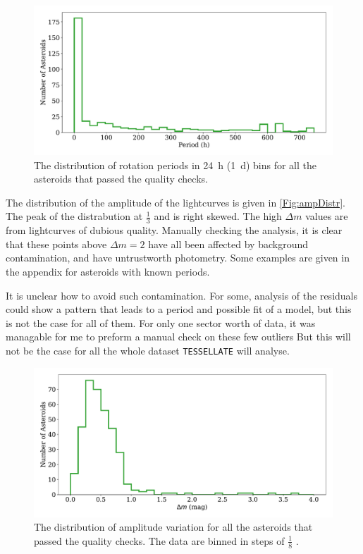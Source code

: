 \documentclass{UCreport}
\begin{document}
\begin{figure}
  \centering
  \includegraphics[width=\textwidth]{./Figures/perDistr.pdf}
  \caption[Period Distribution]{The distribution of rotation periods in \qty{24}{\hour} (\qty{1}{\day}) bins for all the asteroids that passed the quality checks.}
  \label{Fig:PerDistr}
\end{figure}

The distribution of the amplitude of the lightcurves is given in \autoref{Fig:ampDistr}.
The peak of the distrabution at $\frac13$ \unit{\mag} and is right skewed.
The high $\Delta m$ values are from lightcurves of dubious quality. 
Manually checking the analysis, it is clear that these points above $\Delta m =2$ have all been affected by background contamination, and have untrustworth photometry.
Some examples are given in the appendix for asteroids with known periods.

It is unclear how to avoid such contamination.
For some, analysis of the residuals could show a pattern that leads to a period and possible fit of a model, but this is not the case for all of them.
For only one sector worth of data, it was managable for me to preform a manual check on these few outliers
But this will not be the case for all the whole dataset \texttt{TESSELLATE} will analyse. 


\begin{figure}
  \centering
  \includegraphics[width=\textwidth]{./Figures/delMagDistr.pdf}
  \caption[Amplitude Variation Distribution]{The distribution of amplitude variation for all the asteroids that passed the quality checks. 
  The data are binned in steps of $\frac{1}{8}$ \unit{\mag}.
  }
  \label{Fig:ampDistr}
\end{figure}
\end{document}
